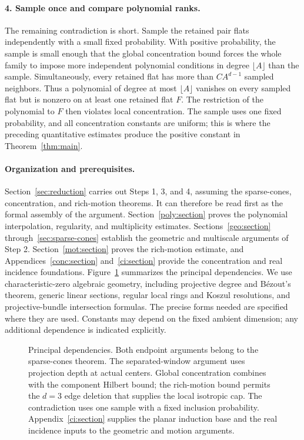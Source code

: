 \paragraph{4. Sample once and compare polynomial ranks.}
The remaining contradiction is short. Sample the retained pair flats
independently with a small fixed probability. With positive probability,
the sample is small enough that the global concentration bound forces
the whole family to impose more independent polynomial conditions
in degree \(\lfloor A\rfloor\) than the sample. Simultaneously,
every retained flat has more than \(CA^{d-1}\) sampled neighbors.
Thus a polynomial of degree at most \(\lfloor A\rfloor\) vanishes on every sampled flat
but is nonzero on at least one retained flat \(F\).
The restriction of the polynomial to
\(F\) then violates local concentration. The sample uses one fixed
probability, and all concentration constants are uniform; this is
where the preceding quantitative estimates produce the positive
constant in Theorem~\ref{thm:main}.

\paragraph{Organization and prerequisites.}
Section~\ref{sec:reduction} carries out Steps 1, 3, and 4, assuming
the sparse-cones, concentration, and rich-motion theorems. It can
therefore be read first as the formal assembly of the argument.
Section~\ref{poly:section} proves the polynomial interpolation,
regularity, and multiplicity estimates. Sections~\ref{geo:section}
through~\ref{sec:sparse-cones} establish the geometric and multiscale
arguments of Step 2. Section~\ref{mot:section} proves the rich-motion
estimate, and Appendices~\ref{conc:section} and~\ref{ci:section}
provide the concentration and real incidence foundations.
Figure~\ref{fig:proof-map} summarizes the principal dependencies.
We use characteristic-zero algebraic geometry, including projective
degree and B\'ezout's theorem, generic linear sections, regular local
rings and Koszul resolutions, and projective-bundle intersection
formulas. The precise forms needed are specified where they are
used. Constants may depend on the fixed ambient dimension; any
additional dependence is indicated explicitly.

\begin{figure}[htbp]
\centering

\caption{Principal dependencies. Both endpoint arguments belong to the
sparse-cones theorem. The separated-window argument uses projection depth
at actual centers. Global concentration combines with the component
Hilbert bound; the rich-motion bound permits the \(d=3\) edge deletion
that supplies the local isotropic cap. The contradiction uses one sample with a
fixed inclusion probability. Appendix~\ref{ci:section} supplies the planar
induction base and the real incidence inputs to the geometric and motion
arguments.}
\label{fig:proof-map}
\end{figure}
